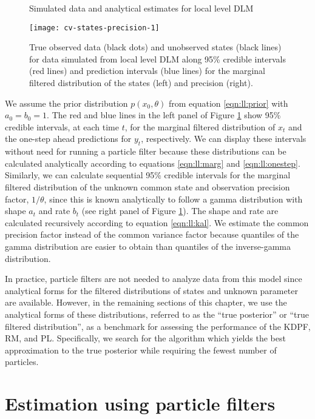 \begin{figure}[ht]
\ssp
\centering
\caption{Simulated data and analytical estimates for local level DLM} \label{fig:comp:data}
\texttt{[image: cv-states-precision-1]}
\caption*{True observed data (black dots) and unobserved states (black lines) for data simulated from local level DLM along 95\% credible intervals (red lines) and prediction intervals (blue lines) for the marginal filtered distribution of the states (left) and precision (right).}
\end{figure}

We assume the prior distribution $p(x_0,\theta)$ from equation \eqref{eqn:ll:prior} with $a_0 = b_0 = 1$. The red and blue lines in the left panel of Figure \ref{fig:comp:data} show 95\% credible intervals, at each time $t$, for the marginal filtered distribution of $x_t$ and the one-step ahead predictions for $y_t$, respectively. We can display these intervals without need for running a particle filter because these distributions can be calculated analytically according to equations \eqref{eqn:ll:marg} and \eqref{eqn:ll:onestep}. Similarly, we can calculate sequential 95\% credible intervals for the marginal filtered distribution of the unknown common state and observation precision factor, $1/\theta$, since this is known analytically to follow a gamma distribution with shape $a_t$ and rate $b_t$  (see right panel of Figure \ref{fig:comp:data}). The shape and rate are calculated recursively according to equation \eqref{eqn:ll:kal}. We estimate the common precision factor instead of the common variance factor because quantiles of the gamma distribution are easier to obtain than quantiles of the inverse-gamma distribution.

In practice, particle filters are not needed to analyze data from this model since analytical forms for the filtered distributions of states and unknown parameter are available. However, in the remaining sections of this chapter, we use the analytical forms of these distributions, referred to as the ``true posterior'' or ``true filtered distribution'', as a benchmark for assessing the performance of the KDPF, RM, and PL. Specifically, we search for the algorithm which yields the best approximation to the true posterior while requiring the fewest number of particles.

\section{Estimation using particle filters} \label{sec:comp:est}

